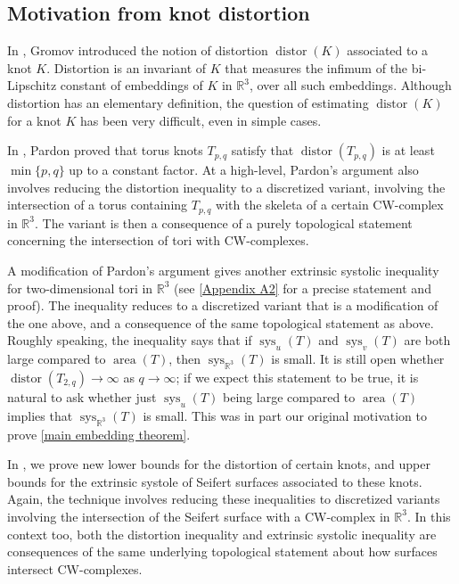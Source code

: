 \documentclass[12pt]{amsart}
\DeclareMathOperator*{\Area}{area}
\DeclareMathOperator*{\sys}{sys}
\DeclareMathOperator*{\dist}{distor}
\theoremstyle{definition}
\begin{document}
\subsection{Motivation from knot distortion} 

In \cite{Gro83}, Gromov introduced the notion of distortion $\dist(K)$ associated to a knot $K$. Distortion is an invariant of $K$ that measures the infimum of the bi-Lipschitz constant of embeddings of $K$ in $\mathbb{R}^3$, over all such embeddings. Although distortion has an elementary definition, the question of estimating $\dist(K)$ for a knot $K$ has been very difficult, even in simple cases.

In \cite{Par11}, Pardon proved that torus knots $T_{p,q}$ satisfy that $\dist(T_{p,q})$ is at least $\min\{p,q\}$ up to a constant factor. At a high-level, Pardon's argument also involves reducing the distortion inequality to a discretized variant, involving the intersection of a torus containing  $T_{p,q}$ with the skeleta of a certain CW-complex in $\mathbb{R}^3$. The variant is then a consequence of a purely topological statement concerning the intersection of tori with CW-complexes.

A modification of Pardon's argument gives another extrinsic systolic inequality for two-dimensional tori in $\mathbb{R}^3$ (see \cref{Appendix A2} for a precise statement and proof). The inequality reduces to a discretized variant that is a modification of the one above, and a consequence of the same topological statement as above. Roughly speaking, the inequality says that if $\sys_u(T)$ and $\sys_v(T)$ are both large compared to $\Area(T)$, then $\sys_{\mathbb{R}^3}(T)$ is small. It is still open whether $\dist(T_{2,q})\to \infty$ as $q\to \infty$; if we expect this statement to be true, it is natural to ask whether just $\sys_u(T)$ being large compared to $\Area(T)$ implies that $\sys_{\mathbb{R}^3}(T)$ is small. This was in part our original motivation to prove \cref{main embedding theorem}. 

In \cite{Vas25}, we prove new lower bounds for the distortion of certain knots, and upper bounds for the extrinsic systole of Seifert surfaces associated to these knots. Again, the technique involves reducing these inequalities to discretized variants involving the intersection of the Seifert surface with a CW-complex in $\mathbb{R}^3$. In this context too, both the distortion inequality and extrinsic systolic inequality are consequences of the same underlying topological statement about how surfaces intersect CW-complexes.
\end{document}
